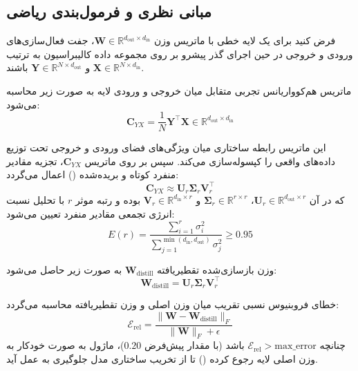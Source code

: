 \subsection{مبانی نظری و فرمول‌بندی ریاضی}
فرض کنید برای یک لایه خطی با ماتریس وزن $\mathbf{W} \in \mathbb{R}^{d_{\text{out}} \times d_{\text{in}}}$، جفت فعال‌سازی‌های ورودی و خروجی در حین اجرای گذر پیشرو بر روی مجموعه داده کالیبراسیون به ترتیب $\mathbf{X} \in \mathbb{R}^{N \times d_{\text{in}}}$ و $\mathbf{Y} \in \mathbb{R}^{N \times d_{\text{out}}}$ باشند.

ماتریس هم‌کوواریانس تجربی متقابل میان خروجی و ورودی لایه به صورت زیر محاسبه می‌شود:
\begin{equation}
\mathbf{C}_{YX} = \frac{1}{N} \mathbf{Y}^\top \mathbf{X} \in \mathbb{R}^{d_{\text{out}} \times d_{\text{in}}}
\end{equation}

این ماتریس رابطه ساختاری میان ویژگی‌های فضای ورودی و خروجی تحت توزیع داده‌های واقعی را کپسوله‌سازی می‌کند. سپس بر روی ماتریس $\mathbf{C}_{YX}$، تجزیه مقادیر منفرد کوتاه و بریده‌شده () اعمال می‌گردد:
\begin{equation}
\mathbf{C}_{YX} \approx \mathbf{U}_r \mathbf{\Sigma}_r \mathbf{V}_r^\top
\end{equation}
که در آن $\mathbf{U}_r \in \mathbb{R}^{d_{\text{out}} \times r}$، $\mathbf{\Sigma}_r \in \mathbb{R}^{r \times r}$ و $\mathbf{V}_r \in \mathbb{R}^{d_{\text{in}} \times r}$ بوده و رتبه موثر $r$ با تحلیل نسبت انرژی تجمعی مقادیر منفرد تعیین می‌شود:
\begin{equation}
E(r) = \frac{\sum_{i=1}^r \sigma_i^2}{\sum_{j=1}^{\min(d_{\text{in}}, d_{\text{out}})} \sigma_j^2} \ge 0.95
\end{equation}

وزن بازسازی‌شده تقطیریافته $\mathbf{W}_{\text{distill}}$ به صورت زیر حاصل می‌شود:
\begin{equation}
\mathbf{W}_{\text{distill}} = \mathbf{U}_r \mathbf{\Sigma}_r \mathbf{V}_r^\top
\end{equation}

خطای فروبنیوس نسبی تقریب میان وزن اصلی و وزن تقطیریافته محاسبه می‌گردد:
\begin{equation}
\mathcal{E}_{\text{rel}} = \frac{\|\mathbf{W} - \mathbf{W}_{\text{distill}}\|_F}{\|\mathbf{W}\|_F + \epsilon}
\end{equation}
چنانچه $\mathcal{E}_{\text{rel}} > \text{max\_error}$ باشد (با مقدار پیش‌فرض $0.20$)، ماژول به صورت خودکار به وزن اصلی لایه رجوع کرده () تا از تخریب ساختاری مدل جلوگیری به عمل آید.

